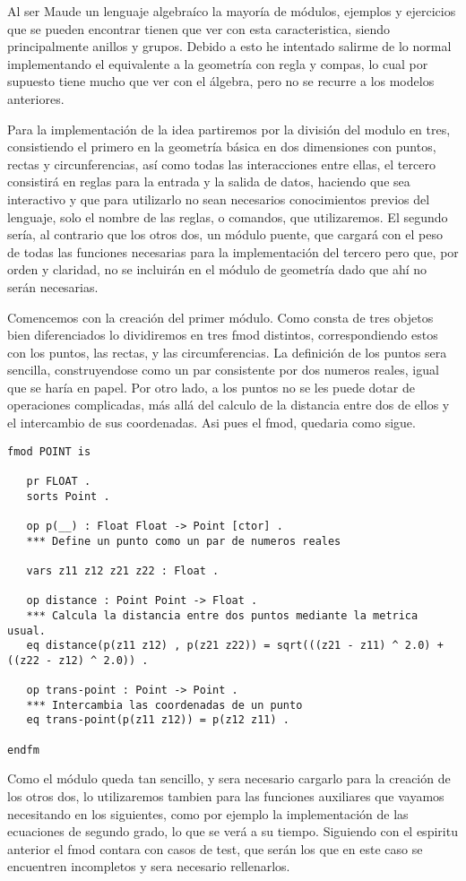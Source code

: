 
Al ser Maude un lenguaje algebraíco la mayoría de módulos, ejemplos y ejercicios que se pueden encontrar tienen que ver con esta caracteristica, siendo principalmente anillos y grupos. Debido a esto he intentado salirme de lo normal implementando el equivalente a la geometría con regla y compas, lo cual por supuesto tiene mucho que ver con el álgebra, pero no se recurre a los modelos anteriores. \par

Para la implementación de la idea partiremos por la división del modulo en tres, consistiendo el primero en la geometría básica en dos dimensiones con puntos, rectas y circunferencias, así como todas las interacciones entre ellas, el tercero consistirá en reglas para la entrada y la salida de datos, haciendo que sea interactivo y que para utilizarlo no sean necesarios conocimientos previos del lenguaje, solo el nombre de las reglas, o comandos, que utilizaremos. El segundo sería, al contrario que los otros dos, un módulo puente, que cargará con el peso de todas las funciones necesarias para la implementación del tercero pero que, por orden y claridad, no se incluirán en el módulo de geometría dado que ahí no serán necesarias. \par

Comencemos con la creación del primer módulo. Como consta de tres objetos bien diferenciados lo dividiremos en tres fmod distintos, correspondiendo estos con los puntos, las rectas, y las circumferencias. La definición de los puntos sera sencilla, construyendose como un par consistente por dos numeros reales, igual que se haría en papel. Por otro lado, a los puntos no se les puede dotar de operaciones complicadas, más allá del calculo de la distancia entre dos de ellos y el intercambio de sus coordenadas. Asi pues el fmod, quedaria como sigue.
{\codesize
\begin{verbatim}
fmod POINT is

   pr FLOAT .
   sorts Point .

   op p(__) : Float Float -> Point [ctor] .
   *** Define un punto como un par de numeros reales

   vars z11 z12 z21 z22 : Float .

   op distance : Point Point -> Float .
   *** Calcula la distancia entre dos puntos mediante la metrica usual.
   eq distance(p(z11 z12) , p(z21 z22)) = sqrt(((z21 - z11) ^ 2.0) + ((z22 - z12) ^ 2.0)) .

   op trans-point : Point -> Point .
   *** Intercambia las coordenadas de un punto
   eq trans-point(p(z11 z12)) = p(z12 z11) .

endfm
\end{verbatim}
}
Como el módulo queda tan sencillo, y sera necesario cargarlo para la creación de los otros dos, lo utilizaremos tambien para las funciones auxiliares que vayamos necesitando en los siguientes, como por ejemplo la implementación de las ecuaciones de segundo grado, lo que se verá a su tiempo. Siguiendo con el espiritu anterior el fmod contara con casos de test, que serán los que en este caso se encuentren incompletos y sera necesario rellenarlos. \par

